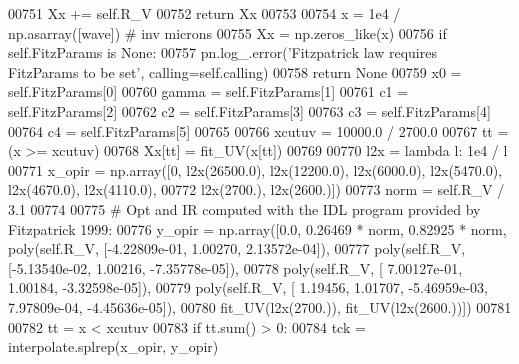 \begin{DoxyVerb}
\begin{DoxyCode}
00751 \textcolor{stringliteral}{            Xx += self.R\_V}
00752 \textcolor{stringliteral}{            return Xx}
00753 \textcolor{stringliteral}{            }
00754 \textcolor{stringliteral}{        x = 1e4 / np.asarray([wave]) # inv microns}
00755 \textcolor{stringliteral}{        Xx = np.zeros\_like(x)}
00756 \textcolor{stringliteral}{        if self.FitzParams is None:}
00757 \textcolor{stringliteral}{            pn.log\_.error('Fitzpatrick law requires FitzParams to be set', calling=self.calling)}
00758 \textcolor{stringliteral}{            return None}
00759 \textcolor{stringliteral}{        x0 = self.FitzParams[0]}
00760 \textcolor{stringliteral}{        gamma = self.FitzParams[1]}
00761 \textcolor{stringliteral}{        c1 = self.FitzParams[2]}
00762 \textcolor{stringliteral}{        c2 = self.FitzParams[3]}
00763 \textcolor{stringliteral}{        c3 = self.FitzParams[4]}
00764 \textcolor{stringliteral}{        c4 = self.FitzParams[5]}
00765 \textcolor{stringliteral}{        }
00766 \textcolor{stringliteral}{        xcutuv = 10000.0 / 2700.0}
00767 \textcolor{stringliteral}{        tt = (x >= xcutuv) }
00768 \textcolor{stringliteral}{        Xx[tt] = fit\_UV(x[tt])}
00769 \textcolor{stringliteral}{        }
00770 \textcolor{stringliteral}{        l2x = lambda l: 1e4 / l}
00771 \textcolor{stringliteral}{        x\_opir = np.array([0, l2x(26500.0), l2x(12200.0), l2x(6000.0), l2x(5470.0), l2x(4670.0),
       l2x(4110.0),}
00772 \textcolor{stringliteral}{                  l2x(2700.), l2x(2600.)])}
00773 \textcolor{stringliteral}{        norm = self.R\_V / 3.1}
00774 \textcolor{stringliteral}{        }
00775 \textcolor{stringliteral}{        # Opt and IR computed with the IDL program provided by Fitzpatrick 1999:        }
00776 \textcolor{stringliteral}{        y\_opir = np.array([0.0, 0.26469 * norm, 0.82925 * norm, poly(self.R\_V, [-4.22809e-01, 1.00270,
       2.13572e-04]),}
00777 \textcolor{stringliteral}{                    poly(self.R\_V, [-5.13540e-02, 1.00216, -7.35778e-05]),}
00778 \textcolor{stringliteral}{                    poly(self.R\_V, [ 7.00127e-01, 1.00184, -3.32598e-05]),}
00779 \textcolor{stringliteral}{                    poly(self.R\_V, [ 1.19456, 1.01707, -5.46959e-03, 7.97809e-04, -4.45636e-05]),}
00780 \textcolor{stringliteral}{                    fit\_UV(l2x(2700.)), fit\_UV(l2x(2600.))])}
00781 \textcolor{stringliteral}{        }
00782 \textcolor{stringliteral}{        tt = x < xcutuv}
00783 \textcolor{stringliteral}{        if tt.sum() > 0:}
00784 \textcolor{stringliteral}{            tck = interpolate.splrep(x\_opir, y\_opir)}

\end{DoxyCode}
\end{DoxyVerb}
